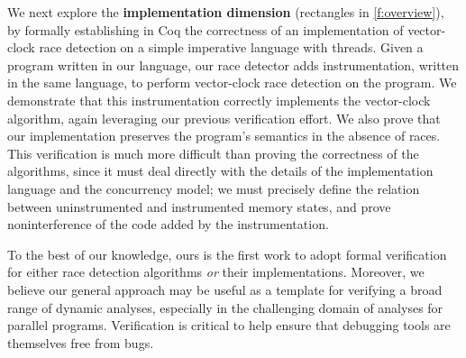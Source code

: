 \documentclass[preprint, 10pt]{sigplanconf}
\newcommand{\ignore}[1]{}
\newcommand{\FT}{\textsc{FastTrack}\xspace}
\begin{document}
We next explore the \textbf{implementation dimension} (rectangles in \autoref{f:overview}), by formally establishing in Coq the correctness of an implementation of vector-clock race detection on a simple imperative language with threads. Given a program written in our language, our race detector adds instrumentation, written in the same language, to perform vector-clock race detection on the program. We demonstrate that this instrumentation correctly implements the vector-clock algorithm, again leveraging our previous verification effort. We also prove that our implementation preserves the program's semantics in the absence of races. This verification is much more difficult than proving the correctness of the algorithms, since it must deal directly with the details of the implementation language and the concurrency model; we must precisely define the relation between uninstrumented and instrumented memory states, and prove noninterference of the code added by the instrumentation. \ignore{While constructing our implementation, we consulted the existing implementation of \FT for guidance, and our verification process brought to light an example of extraneous work performed by the current \FT implementation. This issue is unlikely to have come to light otherwise, but when proving our implementation equivalent to the abstract algorithm such discrepancies were quickly revealed. This again demonstrates the value of formal verification over best-effort implementation, ensuring that an implementation does no less, and no more, than is necessary for correctness.}

To the best of our knowledge, ours is the first work to adopt formal verification for either race detection algorithms \emph{or} their implementations. Moreover, we believe our general approach may be useful as a template for verifying a broad range of dynamic analyses, especially in the challenging domain of analyses for parallel programs. Verification is critical to help ensure that debugging tools are themselves free from bugs.
\end{document}
